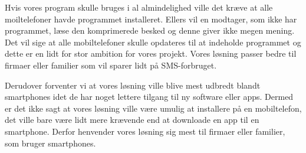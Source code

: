 Hvis vores program skulle bruges i al almindelighed ville det kræve at alle moiltelefoner havde programmet installeret. Ellers vil en modtager, som ikke har programmet, læse den komprimerede besked og denne giver ikke megen mening. Det vil sige at alle mobiltelefoner skulle opdateres til at indeholde programmet og dette er en lidt for stor ambition for vores projekt. Vores løsning passer bedre til firmaer eller familier som vil sparer lidt på SMS-forbruget.

Derudover forventer vi at vores løsning ville blive mest udbredt blandt smartphones idet de har noget lettere tilgang til ny software eller apps. Dermed er det ikke sagt at vores løsning ville være umulig at installere på en mobiltelefon, det ville bare være lidt mere krævende end at downloade en app til en smartphone. Derfor henvender vores løsning sig mest til firmaer eller familier, som bruger smartphones. 